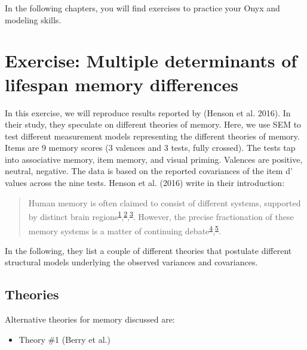 \documentclass[
  letterpaper,
  DIV=11,
  numbers=noendperiod]{scrreprt}
\providecommand{\tightlist}{%
  \setlength{\itemsep}{0pt}\setlength{\parskip}{0pt}}\usepackage{longtable,booktabs,array}
\begin{document}
In the following chapters, you will find exercises to practice your Onyx
and modeling skills.


\chapter{Exercise: Multiple determinants of lifespan memory
differences}\label{exercise-multiple-determinants-of-lifespan-memory-differences}

In this exercise, we will reproduce results reported by (Henson et al.
2016). In their study, they speculate on different theories of memory.
Here, we use SEM to test different measurement models representing the
different theories of memory. Items are 9 memory scores (3 valences and
3 tests, fully crossed). The tests tap into associative memory, item
memory, and visual priming. Valences are positive, neutral, negative.
The data is based on the reported covariances of the item d' values
across the nine tests. Henson et al. (2016) write in their introduction:

\begin{quote}
Human memory is often claimed to consist of different systems, supported
by distinct brain
regions\textsuperscript{\href{https://pmc.ncbi.nlm.nih.gov/articles/PMC5013267/\#b1}{1}},\textsuperscript{\href{https://pmc.ncbi.nlm.nih.gov/articles/PMC5013267/\#b2}{2}},\textsuperscript{\href{https://pmc.ncbi.nlm.nih.gov/articles/PMC5013267/\#b3}{3}}.
However, the precise fractionation of these memory systems is a matter
of continuing
debate\textsuperscript{\href{https://pmc.ncbi.nlm.nih.gov/articles/PMC5013267/\#b4}{4}},\textsuperscript{\href{https://pmc.ncbi.nlm.nih.gov/articles/PMC5013267/\#b5}{5}}.~
\end{quote}

In the following, they list a couple of different theories that
postulate different structural models underlying the observed variances
and covariances.

\section{Theories}\label{theories}

Alternative theories for memory discussed are:

\begin{itemize}
\tightlist
\item
  Theory \#1 (Berry et al.)
\end{itemize}
\end{document}

